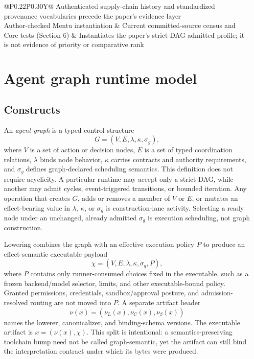 \documentclass[11pt]{article}
\begin{document}
\begin{table}[htbp]
{\begin{tabularx}{\linewidth}{@{}P{0.22\linewidth}P{0.30\linewidth}Y@{}}
Authenticated supply-chain history and standardized provenance vocabularies
precede the paper's evidence layer \\
Author-checked Mentu instantiation &
Current committed-source census and Core tests (Section 6) &
Instantiates the paper's strict-DAG admitted profile; it is not evidence of
priority or comparative rank \\
\bottomrule
\end{tabularx}
}
\caption{Positive-only precedent map. Each scholarly row states a mechanism
that its cited source establishes. No blank cell or omitted system supports an
absence, uniqueness, or novelty inference.}
\label{tab:precedent-map}
\end{table}

\section{Agent graph runtime model}

\subsection*{Constructs}

An \emph{agent graph} is a typed control structure
\[
  G=(V,E,\lambda,\kappa,\sigma_g),
\]
where \(V\) is a set of action or decision nodes, \(E\) is a set of typed
coordination relations, \(\lambda\) binds node behavior, \(\kappa\) carries
contracts and authority requirements, and \(\sigma_g\) defines graph-declared scheduling
semantics.  This definition does not require acyclicity.  A particular runtime
may accept only a strict DAG, while another may admit cycles, event-triggered
transitions, or bounded iteration.
Any operation that creates \(G\), adds or removes a member of \(V\) or \(E\),
or mutates an effect-bearing value in \(\lambda\), \(\kappa\), or \(\sigma_g\)
is construction-lane activity. Selecting a ready node under an unchanged,
already admitted \(\sigma_g\) is execution scheduling, not graph construction.

Lowering combines the graph with an effective execution policy \(P\) to
produce an effect-semantic executable payload
\[
  \chi=(V,E,\lambda,\kappa,\sigma_g,P),
\]
where \(P\) contains only runner-consumed choices fixed in the executable, such
as a frozen backend/model selector, limits, and other executable-bound policy.
Granted permissions, credentials, sandbox/approval posture, and
admission-resolved routing are not moved into \(P\). A separate artifact header
\[
  \nu(x)=(\nu_L(x),\nu_C(x),\nu_\beta(x))
\]
names the lowerer, canonicalizer, and binding-schema versions. The executable
artifact is \(x=(\nu(x),\chi)\). This split is intentional: a semantics-preserving
toolchain bump need not be called graph-semantic, yet the artifact can still
bind the interpretation contract under which its bytes were produced.
\end{document}
